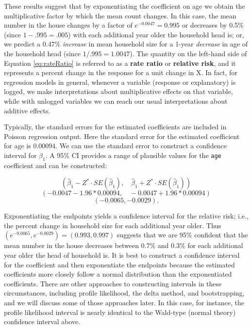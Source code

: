 \documentclass[
]{krantz}
\begin{document}
These results suggest that by exponentiating the coefficient on age we obtain the multiplicative factor by which the mean count changes. In this case, the mean number in the house changes by a factor of \(e^{-0.0047}=0.995\) or decreases by 0.5\% (since \(1-.995 = .005\)) with each additional year older the household head is; or, we predict a 0.47\% \emph{increase} in mean household size for a 1-year \emph{decrease} in age of the household head (since \(1/.995=1.0047\)). The quantity on the left-hand side of Equation \eqref{eq:rateRatio} is referred to as a \textbf{rate ratio} or \textbf{relative risk},  and it represents a percent change in the response for a unit change in X. In fact, for regression models in general, whenever a variable (response or explanatory) is logged, we make interpretations about multiplicative effects on that variable, while with unlogged variables we can reach our usual interpretations about additive effects.

Typically, the standard errors for the estimated coefficients are included in Poisson regression output. Here the standard error for the estimated coefficient for age is 0.00094. We can use the standard error to construct a confidence interval for \(\beta_1\). A 95\% CI provides a range of plausible values for the \texttt{age} coefficient and can be constructed:

\[(\hat\beta_1-Z^*\cdot SE(\hat\beta_1), \quad \hat\beta_1+Z^*\cdot SE(\hat\beta_1))\]
\[(-0.0047-1.96*0.00094, \quad -0.0047+1.96*0.00094)\]
\[ (-0.0065, -0.0029).
 \]

Exponentiating the endpoints yields a confidence interval for the relative risk; i.e., the percent change in household size for each additional year older. Thus \((e^{-0.0065},e^{-0.0029})=(0.993,0.997)\) suggests that we are 95\% confident that the mean number in the house decreases between 0.7\% and 0.3\% for each additional year older the head of household is. It is best to construct a confidence interval for the coefficient and then exponentiate the endpoints because the estimated coefficients more closely follow a normal distribution than the exponentiated coefficients. There are other approaches to constructing intervals in these circumstances, including profile likelihood, the delta method, and bootstrapping, and we will discuss some of those approaches later. In this case, for instance, the profile likelihood interval is nearly identical to the Wald-type (normal theory) confidence interval  above.
\end{document}
